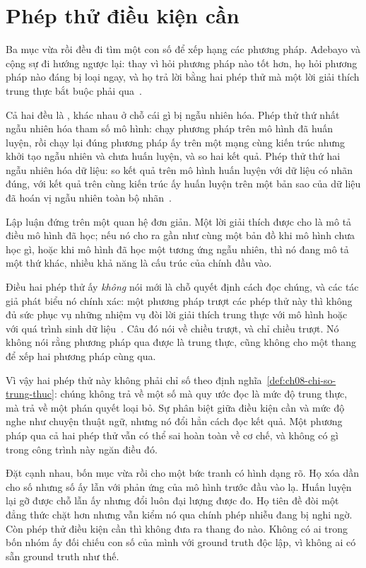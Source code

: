 \section{Phép thử điều kiện cần}
\label{sec:ch08-dieu-kien-can}

%
%
Ba mục vừa rồi đều đi tìm một con số để xếp hạng các phương pháp. Adebayo và
cộng sự đi hướng ngược lại: thay vì hỏi phương pháp nào tốt hơn, họ hỏi phương
pháp nào đáng bị loại ngay, và họ trả lời bằng hai phép thử mà một lời giải
thích trung thực bắt buộc phải qua~\autocite{msanity}.

Cả hai đều là , khác nhau ở chỗ
cái gì bị ngẫu nhiên hóa. Phép thử thứ nhất ngẫu nhiên hóa tham số mô hình: chạy phương pháp trên mô hình
đã huấn luyện, rồi chạy lại đúng phương pháp ấy trên một mạng cùng kiến trúc
nhưng khởi tạo ngẫu nhiên và chưa huấn luyện, và so hai kết quả. Phép thử thứ
hai ngẫu nhiên hóa dữ liệu: so kết quả trên mô hình huấn luyện với dữ liệu có
nhãn đúng, với kết quả trên cùng kiến trúc ấy huấn luyện trên một bản sao của dữ
liệu đã hoán vị ngẫu nhiên toàn bộ nhãn~\autocite{msanity}.

Lập luận đứng trên một quan hệ đơn giản. Một lời giải thích được cho là mô tả
điều mô hình đã học; nếu nó cho ra gần như cùng một bản đồ khi mô hình chưa học gì,
hoặc khi mô hình đã học một tương ứng ngẫu nhiên, thì nó đang mô tả một thứ
khác, nhiều khả năng là cấu trúc của chính đầu vào.

Điều hai phép thử ấy \emph{không} nói mới là chỗ quyết định cách đọc chúng, và
các tác giả phát biểu nó chính xác: một phương pháp trượt các phép thử này thì không đủ
sức phục vụ những nhiệm vụ đòi lời giải thích trung thực với mô hình hoặc với
quá trình sinh dữ liệu~\autocite{msanity}. Câu đó nói về chiều trượt, và chỉ
chiều trượt. Nó không nói rằng phương pháp qua được là trung thực, cũng không
cho một thang để xếp hai phương pháp cùng qua.

Vì vậy hai phép thử này không phải chỉ số theo
định nghĩa~\ref{def:ch08-chi-so-trung-thuc}: chúng không trả về một số mà quy
ước đọc là mức độ trung thực, mà trả về một phán quyết loại bỏ. Sự phân biệt
giữa điều kiện cần và mức độ nghe như chuyện thuật ngữ, nhưng nó đổi hẳn cách
đọc kết quả. Một phương pháp qua cả hai phép thử vẫn có thể sai hoàn toàn về cơ
chế, và không có gì trong công trình này ngăn điều đó.

Đặt cạnh nhau, bốn mục vừa rồi cho một bức tranh có hình dạng rõ. Họ xóa dần cho
số nhưng số ấy lẫn với phản ứng của mô hình trước đầu vào lạ. Huấn luyện lại gỡ
được chỗ lẫn ấy nhưng đổi luôn đại lượng được đo. Họ tiên đề đòi một đẳng thức
chặt hơn nhưng vẫn kiểm nó qua chính phép nhiễu đang bị nghi ngờ. Còn phép thử
điều kiện cần thì không đưa ra thang đo nào. Không có ai trong bốn nhóm ấy đối
chiếu con số của mình với ground truth độc lập, vì không ai có sẵn ground truth
như thế.
